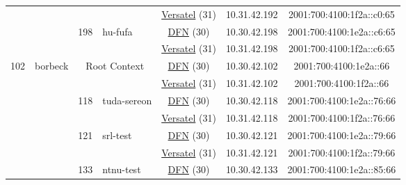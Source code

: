 \begin{small}
\begin{center}
\begin{longtable}{|c|c|c|c|c|c|c|c|}
  &  &  &  & \multicolumn{2}{|c|}{\tiny{\href{http://www.versatel.de}{Versatel} (31)}} & \tiny{10.31.42.192} & \tiny{2001:700:4100:1f2a::c0:65} \\* \cline{3-3}\cline{4-4}\cline{5-5}\cline{6-6}\cline{7-7}\cline{8-8}
  &  & \multirow{2}{*}{\tiny{198}} & \multicolumn{1}{|l|}{\multirow{2}{*}{\tiny{hu-fufa}}} & \multicolumn{2}{|c|}{\tiny{\href{https://www.dfn.de}{DFN} (30)}} & \tiny{10.30.42.198} & \tiny{2001:700:4100:1e2a::c6:65} \\* \cline{5-5}\cline{6-6}\cline{7-7}\cline{8-8}
  &  &  &  & \multicolumn{2}{|c|}{\tiny{\href{http://www.versatel.de}{Versatel} (31)}} & \tiny{10.31.42.198} & \tiny{2001:700:4100:1f2a::c6:65} \\ \hline
 \multirow{30}{*}{\tiny{102}} & \multicolumn{1}{|l|}{\multirow{30}{*}{\tiny{borbeck}}} & \multicolumn{2}{|c|}{\multirow{2}{*}{\tiny{Root Context}}} & \multicolumn{2}{|c|}{\tiny{\href{https://www.dfn.de}{DFN} (30)}} & \tiny{10.30.42.102} & \tiny{2001:700:4100:1e2a::66} \\* \cline{5-5}\cline{6-6}\cline{7-7}\cline{8-8}
  &  & \multicolumn{2}{|c|}{} & \multicolumn{2}{|c|}{\tiny{\href{http://www.versatel.de}{Versatel} (31)}} & \tiny{10.31.42.102} & \tiny{2001:700:4100:1f2a::66} \\* \cline{3-3}\cline{4-4}\cline{5-5}\cline{6-6}\cline{7-7}\cline{8-8}
  &  & \multirow{2}{*}{\tiny{118}} & \multicolumn{1}{|l|}{\multirow{2}{*}{\tiny{tuda-sereon}}} & \multicolumn{2}{|c|}{\tiny{\href{https://www.dfn.de}{DFN} (30)}} & \tiny{10.30.42.118} & \tiny{2001:700:4100:1e2a::76:66} \\* \cline{5-5}\cline{6-6}\cline{7-7}\cline{8-8}
  &  &  &  & \multicolumn{2}{|c|}{\tiny{\href{http://www.versatel.de}{Versatel} (31)}} & \tiny{10.31.42.118} & \tiny{2001:700:4100:1f2a::76:66} \\* \cline{3-3}\cline{4-4}\cline{5-5}\cline{6-6}\cline{7-7}\cline{8-8}
  &  & \multirow{2}{*}{\tiny{121}} & \multicolumn{1}{|l|}{\multirow{2}{*}{\tiny{srl-test}}} & \multicolumn{2}{|c|}{\tiny{\href{https://www.dfn.de}{DFN} (30)}} & \tiny{10.30.42.121} & \tiny{2001:700:4100:1e2a::79:66} \\* \cline{5-5}\cline{6-6}\cline{7-7}\cline{8-8}
  &  &  &  & \multicolumn{2}{|c|}{\tiny{\href{http://www.versatel.de}{Versatel} (31)}} & \tiny{10.31.42.121} & \tiny{2001:700:4100:1f2a::79:66} \\* \cline{3-3}\cline{4-4}\cline{5-5}\cline{6-6}\cline{7-7}\cline{8-8}
  &  & \multirow{2}{*}{\tiny{133}} & \multicolumn{1}{|l|}{\multirow{2}{*}{\tiny{ntnu-test}}} & \multicolumn{2}{|c|}{\tiny{\href{https://www.dfn.de}{DFN} (30)}} & \tiny{10.30.42.133} & \tiny{2001:700:4100:1e2a::85:66} \\* \cline{5-5}\cline{6-6}\cline{7-7}\cline{8-8}

\end{longtable}
\end{center}
\end{small}
